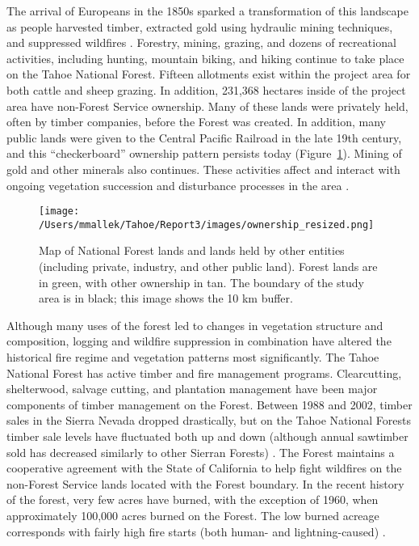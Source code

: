 The arrival of Europeans in the 1850s sparked a transformation of this landscape as people harvested timber, extracted gold using hydraulic mining techniques, and suppressed wildfires \citep{Storer1963}. Forestry, mining, grazing, and dozens of recreational activities, including hunting, mountain biking, and hiking continue to take place on the Tahoe National Forest. Fifteen allotments exist within the project area for both cattle and sheep grazing. In addition, 231,368 hectares inside of the project area have non-Forest Service ownership. Many of these lands were privately held, often by timber companies, before the Forest was created. In addition, many public lands were given to the Central Pacific Railroad in the late 19th century, and this ``checkerboard'' ownership pattern persists today (Figure~\ref{ownership}). Mining of gold and other minerals also continues. These activities affect and interact with ongoing vegetation succession and disturbance processes in the area \citep{USDAForestService2014}.

\begin{figure}[!htbp]
\centering
\texttt{[image: /Users/mmallek/Tahoe/Report3/images/ownership\_resized.png]}
\caption{Map of National Forest lands and lands held by other entities (including private, industry, and other public land). Forest lands are in green, with other ownership in tan. The boundary of the study area is in black; this image shows the 10 km buffer.} 
\label{ownership}
\end{figure}

Although many uses of the forest led to changes in vegetation structure and composition, logging and wildfire suppression in combination have altered the historical fire regime and vegetation patterns most significantly. The Tahoe National Forest has active timber and fire management programs. Clearcutting, shelterwood, salvage cutting, and plantation management have been major components of timber management on the Forest. Between 1988 and 2002, timber sales in the Sierra Nevada dropped drastically, but on the Tahoe National Forests timber sale levels have fluctuated both up and down (although annual sawtimber sold has decreased similarly to other Sierran Forests) \citep{USDAForestService2004}. The Forest maintains a cooperative agreement with the State of California to help fight wildfires on the non-Forest Service lands located with the Forest boundary. In the recent history of the forest, very few acres have burned, with the exception of 1960, when approximately 100,000 acres burned on the Forest. The low burned acreage corresponds with fairly high fire starts (both human- and lightning-caused) \citep{USDAForestService1990}.

